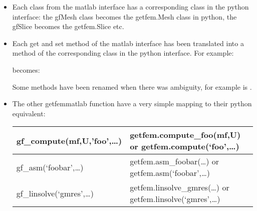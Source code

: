\documentclass[a4paper,11pt,english]{sphinxmanual}
\begin{document}
\begin{itemize}
\item {} 
Each class from the matlab interface has a corresponding class in the
python interface: the gfMesh class becomes the getfem.Mesh class in python,
the gfSlice becomes the getfem.Slice etc.

\item {} 
Each get and set method of the matlab interface has been translated into a
method of the corresponding class in the python interface. For example:

\begin{sphinxVerbatim}[commandchars=\\\{\}]
 
 
\end{sphinxVerbatim}

becomes:

\begin{sphinxVerbatim}[commandchars=\\\{\}]
\end{sphinxVerbatim}

Some methods have been renamed when there was ambiguity, for example
 is .

\item {} 
The other getfem\sphinxhyphen{}matlab function have a very simple mapping to their python
equivalent:


\begin{savenotes}\sphinxattablestart
\centering
\begin{tabulary}{\linewidth}[t]{|T|T|}
\hline

gf\_compute(mf,U,’foo’,…)
&
getfem.compute\_foo(mf,U) or
getfem.compute(‘foo’,…)
\\
\hline
gf\_asm(‘foobar’,…)
&
getfem.asm\_foobar(…) or
getfem.asm(‘foobar’,…)
\\
\hline
gf\_linsolve(‘gmres’,…)
&
getfem.linsolve\_gmres(…) or
getfem.linsolve(‘gmres’,…)
\\
\hline
\end{tabulary}
\par
\sphinxattableend\end{savenotes}

\end{itemize}
\end{document}
